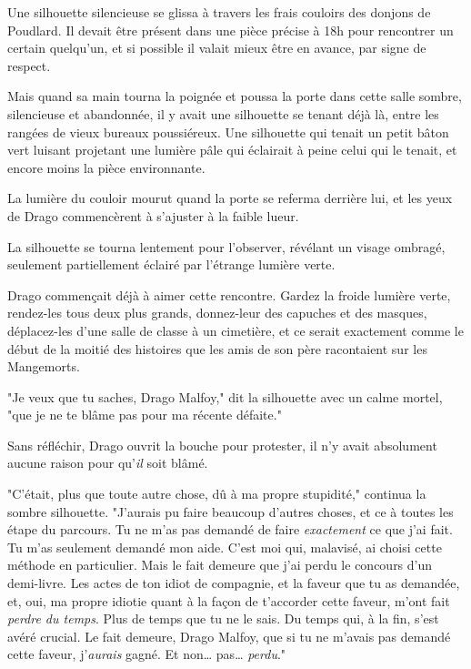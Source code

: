 \later

Une silhouette silencieuse se glissa à travers les frais couloirs des donjons de Poudlard. Il devait être présent dans une pièce précise à 18h pour rencontrer un certain quelqu'un, et si possible il valait mieux être en avance, par signe de respect.

Mais quand sa main tourna la poignée et poussa la porte dans cette salle sombre, silencieuse et abandonnée, il y avait une silhouette se tenant déjà là, entre les rangées de vieux bureaux poussiéreux. Une silhouette qui tenait un petit bâton vert luisant projetant une lumière pâle qui éclairait à peine celui qui le tenait, et encore moins la pièce environnante.

La lumière du couloir mourut quand la porte se referma derrière lui, et les yeux de Drago commencèrent à s'ajuster à la faible lueur.

La silhouette se tourna lentement pour l'observer, révélant un visage ombragé, seulement partiellement éclairé par l'étrange lumière verte.

Drago commençait déjà à aimer cette rencontre. Gardez la froide lumière verte, rendez-les tous deux plus grands, donnez-leur des capuches et des masques, déplacez-les d'une salle de classe à un cimetière, et ce serait exactement comme le début de la moitié des histoires que les amis de son père racontaient sur les Mangemorts.

"Je veux que tu saches, Drago Malfoy," dit la silhouette avec un calme mortel, "que je ne te blâme pas pour ma récente défaite."

Sans réfléchir, Drago ouvrit la bouche pour protester, il n'y avait absolument aucune raison pour qu'\emph{il} soit blâmé.

"C'était, plus que toute autre chose, dû à ma propre stupidité," continua la sombre silhouette. "J'aurais pu faire beaucoup d'autres choses, et ce à toutes les étape du parcours. Tu ne m'as pas demandé de faire \emph{exactement} ce que j'ai fait. Tu m'as seulement demandé mon aide. C'est moi qui, malavisé, ai choisi cette méthode en particulier. Mais le fait demeure que j'ai perdu le concours d'un demi-livre. Les actes de ton idiot de compagnie, et la faveur que tu as demandée, et, oui, ma propre idiotie quant à la façon de t'accorder cette faveur, m'ont fait \emph{perdre du temps}. Plus de temps que tu ne le sais. Du temps qui, à la fin, s'est avéré crucial. Le fait demeure, Drago Malfoy, que si tu ne m'avais pas demandé cette faveur, j'\emph{aurais} gagné. Et non… pas… \emph{perdu}."

